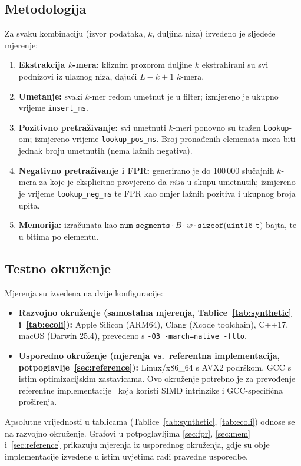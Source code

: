 \documentclass[12pt,a4paper]{article}
\begin{document}
\subsection{Metodologija}
Za svaku kombinaciju (izvor podataka, $k$, duljina niza) izvedeno je sljedeće mjerenje:
\begin{enumerate}
    \item \textbf{Ekstrakcija $k$-mera:} kliznim prozorom duljine $k$ ekstrahirani su
          svi podnizovi iz ulaznog niza, dajući $L - k + 1$ $k$-mera.
    \item \textbf{Umetanje:} svaki $k$-mer redom umetnut je u filter; izmjereno je
          ukupno vrijeme \texttt{insert\_ms}.
    \item \textbf{Pozitivno pretraživanje:} svi umetnuti $k$-meri ponovno su tražen
          \texttt{Lookup}-om; izmjereno vrijeme \texttt{lookup\_pos\_ms}. Broj
          pronađenih elemenata mora biti jednak broju umetnutih (nema lažnih negativa).
    \item \textbf{Negativno pretraživanje i FPR:} generirano je do 100\,000 slučajnih
          $k$-mera za koje je eksplicitno provjereno da \emph{nisu} u skupu umetnutih;
          izmjereno je vrijeme \texttt{lookup\_neg\_ms} te FPR kao omjer lažnih
          pozitiva i ukupnog broja upita.
    \item \textbf{Memorija:} izračunata kao
          $\texttt{num\_segments} \cdot B \cdot w \cdot \texttt{sizeof(uint16\_t)}$
          bajta, te u bitima po elementu.
\end{enumerate}

\subsection{Testno okruženje}
\label{sec:env}
Mjerenja su izvedena na dvije konfiguracije:
\begin{itemize}
    \item \textbf{Razvojno okruženje (samostalna mjerenja, Tablice~\ref{tab:synthetic}
          i~\ref{tab:ecoli}):} Apple Silicon (ARM64), Clang (Xcode toolchain), C++17,
          macOS (Darwin 25.4), prevedeno s \texttt{-O3 -march=native -flto}.
    \item \textbf{Usporedno okruženje (mjerenja vs.~referentna implementacija,
          potpoglavlje~\ref{sec:reference}):} Linux/x86\_64 s AVX2 podrškom, GCC s
          istim optimizacijskim zastavicama. Ovo okruženje potrebno je za prevođenje
          referentne implementacije~\cite{wanghanchengchn-repo} koja koristi SIMD
          intrinzike i GCC-specifična proširenja.
\end{itemize}
\noindent Apsolutne vrijednosti u tablicama (Tablice~\ref{tab:synthetic},
\ref{tab:ecoli}) odnose se na razvojno okruženje. Grafovi u potpoglavljima
\ref{sec:fpr}, \ref{sec:mem} i~\ref{sec:reference} prikazuju mjerenja iz usporednog
okruženja, gdje su obje implementacije izvedene u istim uvjetima radi pravedne
usporedbe.
\end{document}
